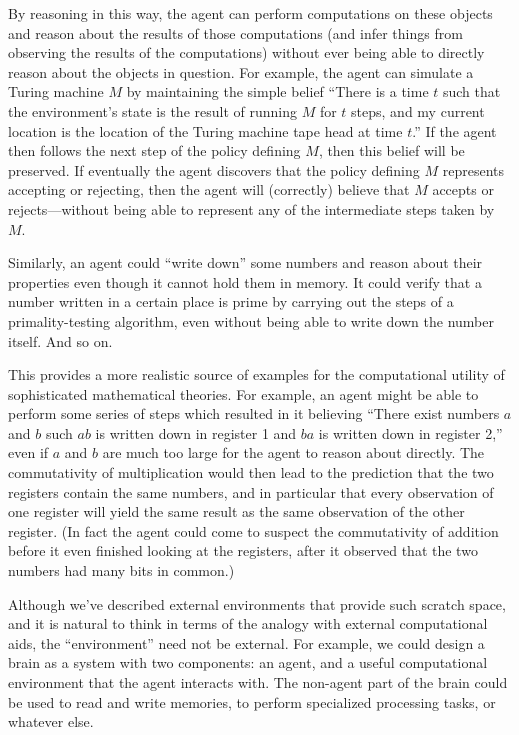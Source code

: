 \documentclass[12pt]{article}
\theoremstyle{definition}
\begin{document}
By reasoning in this way, the agent can perform computations on these objects
and reason about the results of those computations
(and infer things from observing the results of the computations) without ever being
able to directly reason about the objects in question.
For example, the agent can simulate a Turing machine $M$
by maintaining the simple belief ``There is a time $t$
such that the environment's state is the result of running
$M$ for $t$ steps, and my current location
is the location of the Turing machine tape head at time $t$.''
If the agent then follows the next step of the policy defining $M$,
then this belief will be preserved.
If eventually the agent discovers that the policy defining $M$
represents accepting or rejecting, then the agent
will (correctly) believe that $M$ accepts or rejects---without
being able to represent any of the intermediate steps
taken by $M$.

Similarly, an agent could ``write down'' some numbers
and reason about their properties even though it cannot
hold them in memory.
It could verify that a number written in a certain place
is prime by carrying out the steps of a primality-testing
algorithm, even without being able to write down the number itself.
And so on.

This provides a more realistic source of examples
for the computational utility of sophisticated mathematical theories.
For example, an agent might be able to perform some series of steps which resulted in it believing
``There exist numbers $a$ and $b$ such $ab$ is written down in register 1
and $ba$ is written down in register 2,''
even if $a$ and $b$ are much too large for the agent to reason about directly.
The commutativity of multiplication would then lead to the prediction that the two
registers contain the same numbers,
and in particular that every observation of one register will yield
the same result as the same observation of the other register.
(In fact the agent could come to suspect the commutativity of addition
before it even finished looking at the registers, after it observed
that the two numbers had many bits in common.)

Although we've described external environments that provide
such scratch space, and it is natural to think in terms of the analogy
with external computational aids, the ``environment'' need not be external.
For example, we could design a brain as a system with two components:
an agent, and a useful computational environment that the agent interacts with.
The non-agent part of the brain could be used to read and write memories,
to perform specialized processing tasks, or whatever else.
\end{document}
